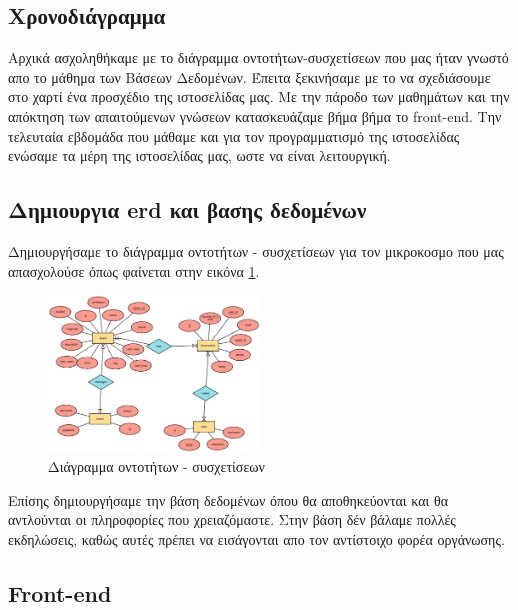 \documentclass{acmart}
\begin{document}
\subsection*{Χρονοδιάγραμμα}
Αρχικά ασχοληθήκαμε με το διάγραμμα οντοτήτων-συσχετίσεων που μας ήταν γνωστό απο το μάθημα των Βάσεων Δεδομένων.
Έπειτα ξεκινήσαμε με το να σχεδιάσουμε στο χαρτί ένα προσχέδιο της ιστοσελίδας μας. 
Με την πάροδο των μαθημάτων και την απόκτηση των απαιτούμενων γνώσεων κατασκευάζαμε βήμα βήμα το front-end. 
Την τελευταία εβδομάδα που μάθαμε και για τον προγραμματισμό της ιστοσελίδας ενώσαμε τα μέρη της ιστοσελίδας μας, 
ωστε να είναι λειτουργική.

\subsection*{Δημιουργια erd και βασης δεδομένων}
Δημιουργήσαμε το διάγραμμα οντοτήτων - συσχετίσεων για τον μικροκοσμο που μας απασχολούσε όπως φαίνεται 
στην εικόνα \ref{fig:diagram}.
\begin{figure}[H]
       \includegraphics[width=0.5\textwidth]{diagram.png}
       \caption{Διάγραμμα οντοτήτων - συσχετίσεων}
       \label{fig:diagram}
\end{figure}
Επίσης δημιουργήσαμε την βάση δεδομένων όπου θα αποθηκεύονται και θα αντλούνται οι πληροφορίες 
που χρειαζόμαστε. Στην βάση δέν βάλαμε πολλές εκδηλώσεις, καθώς αυτές πρέπει να εισάγονται απο 
τον αντίστοιχο φορέα οργάνωσης.
\subsection{Front-end}
\end{document}
